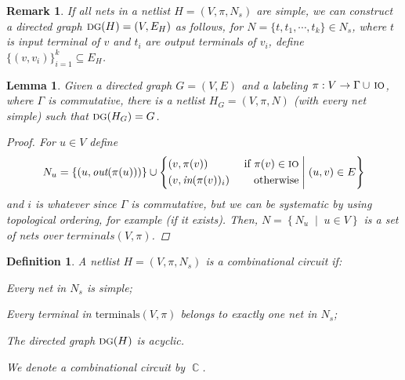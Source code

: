 \documentclass[12pt]{article}
\newcommand{\set}[2]{\left\{{#1}\;\middle|\;{#2}\right\}}
\newcommand{\scrf}[1]{{\scriptstyle\textup{\footnotesize #1}}}
\DeclareMathOperator{\Circ}{\mathbb{C}}
\newtheorem{definition}[theorem]{Definition}
\newtheorem{lemma}[theorem]{Lemma}
\newtheorem{remark}[theorem]{Remark}
\begin{document}
\begin{remark}
  If all nets in a netlist $H=(V,\pi,N_s)$ are simple, we can construct a directed graph $\scrf{DG}(H)=(V,E_H)$ as follows, for $N=\{t,t_1,\cdots,t_k\}\in N_s$, where $t$ is input terminal of $v$ and $t_i$ are output terminals of $v_i$, define $\{(v,v_i)\}_{i=1}^k\subseteq E_H$.
\end{remark}

\begin{lemma}
  \label{graph_netlist}
  Given a directed graph $G=(V,E)$ and a labeling $\pi:V\to\Gamma\cup\,\scrf{IO}$, where $\Gamma$ is commutative, there is a netlist $H_G=(V,\pi,N)$ (with every net simple) such that $\scrf{DG}(H_G)=G$. 
  \begin{proof}
    For $u\in V$ define $$N_u=\{(u,\textit{out}(\pi(u)))\}\cup\set{{\begin{aligned}
      &(v,\pi(v))&\text{ if }\pi(v)\in\scrf{IO}\\
      &(v,\textit{in}(\pi(v))_i)&\text{ otherwise}
    \end{aligned}}}{(u,v)\in E}$$ and $i$ is whatever since $\Gamma$ is commutative, but we can be systematic by using topological ordering, for example (if it exists). Then, $N=\set{N_u}{u\in V}$ is a set of nets over $\textit{terminals}(V,\pi)$.
  \end{proof}
\end{lemma}

\begin{definition}
  A netlist $H=(V,\pi,N_s)$ is a combinational circuit if:
  \begin{compactenum}[(i)]
    \item Every net in $N_s$ is simple;
    \item Every terminal in $\text{terminals}(V,\pi)$ belongs to exactly one net in $N_s$;
    \item The directed graph $\scrf{DG}(H)$ is acyclic.
  \end{compactenum}
  We denote a combinational circuit by $\Circ$.
\end{definition}
\end{document}
